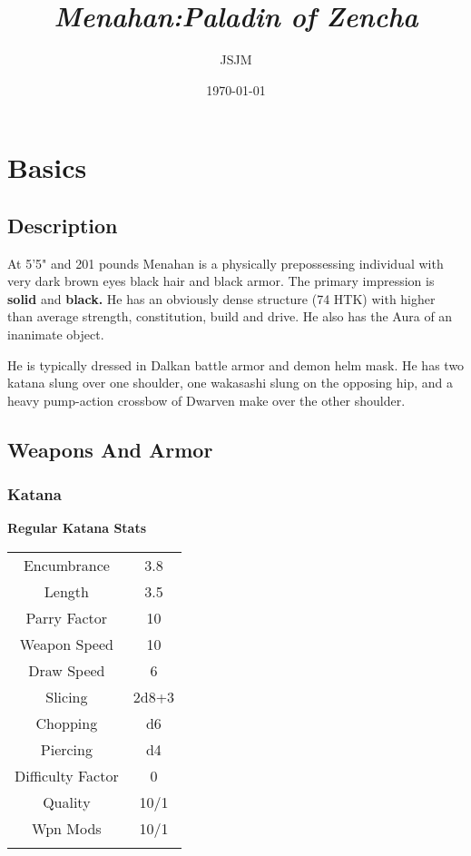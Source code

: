 \documentclass[10pt]{report}
\begin{document}
\title{{\it Menahan:Paladin of Zencha}}
\author{JSJM}
\date{\today}
\maketitle

\chapter{Basics}
\section{Description}

At  5'5"  and 201 pounds Menahan is a physically prepossessing individual with very dark brown eyes
black hair and black armor. The primary impression is {\bf solid } and  {\bf black. }
He has an obviously dense structure (74 HTK) with higher than average strength, constitution, build and drive.
He also has the Aura of an inanimate object.

He is typically dressed in Dalkan battle armor and demon helm mask. He has two katana slung over one shoulder,
one wakasashi slung on the opposing hip, and a heavy pump-action crossbow of Dwarven make over the
other shoulder.

\section{Weapons And Armor}
\subsection{Katana}

\begin{table}{\bf Regular Katana Stats}\\[1ex]
  \begin{tabular}{|c|c|}\hline
          &      \\ \hline
Encumbrance     & 3.8   \\
Length  & 3.5 \\
Parry Factor    & 10    \\
Weapon Speed    & 10    \\
Draw Speed      & 6     \\
Slicing         & 2d8+3 \\
Chopping        & d6 \\
Piercing                & d4 \\
Difficulty Factor       & 0 \\
Quality         & 10/1 \\
Wpn Mods        & 10/1 \\
          &      \\ \hline
  \end{tabular} \\[0.5ex]
{}
\end{table}
\end{document}
